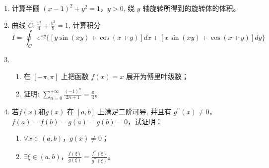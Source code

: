 \begin{enumerate}


\item 
计算半圆 $(x-1)^{2}+y^{2}=1$，$ y>0$, 绕 $y$ 轴旋转所得到的旋转体的体积。




\item 
曲线 $C: \frac{x^{2}}{4}+\frac{y^{2}}{9}=1$, 计算积分
\[ I=\oint_{C} e^{x y}\{[y \sin (x y)+\cos (x+y)] d x+[x \sin (x y)+\cos (x+y)] d y\} \]



\newpage
\item 
\begin{enumerate}
	\item
	在 $[-\pi, \pi]$ 上把函数 $f(x)=x$ 展开为傅里叶级数；
	\item 
	证明: $\sum\limits_{n=0}^{+\infty} \frac{(-1)^{n}}{2 n+1}=\frac{\pi}{4}$。
	
\end{enumerate}







\item 
若$f(x)$和$ g(x)$ 在 $[a, b]$ 上满足二阶可导, 并且有 $g^{\prime \prime}(x) \neq 0$，$ f(a)=f(b)=g(a)=g(b)=0$，试证明：
\begin{enumerate}
	\item
	$ \forall x \in(a, b)$，$  g(x) \neq 0 $；
	\item 
	$ \exists \xi \in(a, b)$，$ \frac{f(\xi)}{g(\xi)}=\frac{f^{\prime \prime}(\xi)}{g^{\prime \prime}(\xi)}$。
	

\end{enumerate}
\end{enumerate}
